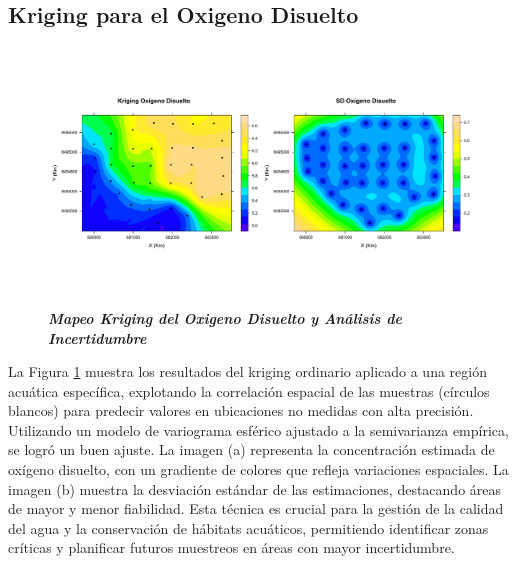 \subsection{Kriging para el Oxigeno Disuelto}
\begin{figure}[!htb]
    \centering
    \includegraphics[width=1\linewidth]{Figuras_AED/ESTIMACION/OD_KRIGING.pdf}
    \caption{\textbf{\textit{Mapeo Kriging del Oxigeno Disuelto y Análisis de Incertidumbre}} }
    \label{fig:enter-labelcdf}
\end{figure}

 La Figura \ref{fig:enter-labelcdf} muestra los resultados del kriging ordinario aplicado a una región acuática específica, explotando la correlación espacial de las muestras (círculos blancos) para predecir valores en ubicaciones no medidas con alta precisión. Utilizando un modelo de variograma esférico ajustado a la semivarianza empírica, se logró un buen ajuste. La imagen (a) representa la concentración estimada de oxígeno disuelto, con un gradiente de colores que refleja variaciones espaciales. La imagen (b) muestra la desviación estándar de las estimaciones, destacando áreas de mayor y menor fiabilidad. Esta técnica es crucial para la gestión de la calidad del agua y la conservación de hábitats acuáticos, permitiendo identificar zonas críticas y planificar futuros muestreos en áreas con mayor incertidumbre.


